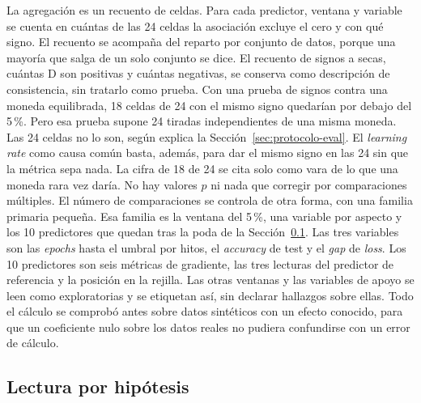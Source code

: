 La agregación es un recuento de celdas. Para cada predictor, ventana y variable se cuenta en cuántas de las 24 celdas la asociación excluye el cero y con qué signo. El recuento se acompaña del reparto por conjunto de datos, porque una mayoría que salga de un solo conjunto se dice. El recuento de signos a secas, cuántas D son positivas y cuántas negativas, se conserva como descripción de consistencia, sin tratarlo como prueba. Con una prueba de signos contra una moneda equilibrada, 18 celdas de 24 con el mismo signo quedarían por debajo del 5\,\%. Pero esa prueba supone 24 tiradas independientes de una misma moneda. Las 24 celdas no lo son, según explica la Sección~\ref{sec:protocolo-eval}. El \emph{learning rate} como causa común basta, además, para dar el mismo signo en las 24 sin que la métrica sepa nada. La cifra de 18 de 24 se cita solo como vara de lo que una moneda rara vez daría. No hay valores $p$ ni nada que corregir por comparaciones múltiples. El número de comparaciones se controla de otra forma, con una familia primaria pequeña. Esa familia es la ventana del 5\,\%, una variable por aspecto y los 10 predictores que quedan tras la poda de la Sección~\ref{sec:protocolo-objetivos}. Las tres variables son las \emph{epochs} hasta el umbral por hitos, el \emph{accuracy} de test y el \emph{gap} de \emph{loss}. Los 10 predictores son seis métricas de gradiente, las tres lecturas del predictor de referencia y la posición en la rejilla. Las otras ventanas y las variables de apoyo se leen como exploratorias y se etiquetan así, sin declarar hallazgos sobre ellas. Todo el cálculo se comprobó antes sobre datos sintéticos con un efecto conocido, para que un coeficiente nulo sobre los datos reales no pudiera confundirse con un error de cálculo.

\subsection{Lectura por hipótesis}
\label{sec:protocolo-objetivos}

